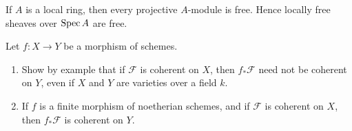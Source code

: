 \documentclass[12pt]{article}
\begin{document}
\begin{proposition}
    If $A$ is a local ring, then every projective $A$-module is free. Hence locally free sheaves over $\operatorname{Spec} A$ are free.
\end{proposition}


\begin{exercise}
    Let \(f:X\to Y\) be a morphism of schemes.
    \begin{enumerate}
        \item[(a)] Show by example that if \(\mathcal F\) is coherent on \(X\), then \(f_*\mathcal F\) need not be coherent on \(Y\), even if \(X\) and \(Y\) are varieties over a field \(k\).
        \item[(b)] If \(f\) is a finite morphism of noetherian schemes, and if \(\mathcal F\) is coherent on \(X\), then \(f_*\mathcal F\) is coherent on \(Y\).
    \end{enumerate}
\end{exercise}
\end{document}
